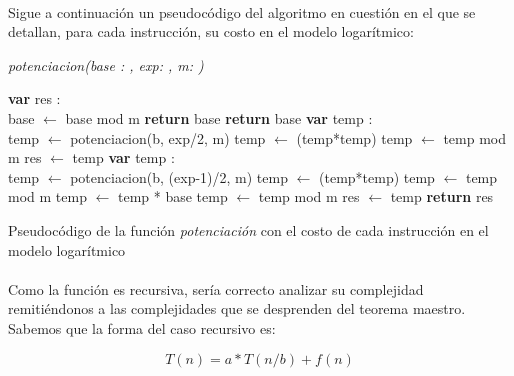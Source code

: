 {\paragraph{}
Sigue a continuación un pseudocódigo del algoritmo en cuestión en el que se detallan, para cada instrucción, su costo en el modelo logarítmico: \\

\newpage
	\incmargin{1em}
	\linesnumbered

	\textsl{potenciacion(base : \nat,  exp: \nat,  m: \nat)}\\
		\begin{algorithm}[H]
			\BlankLine
			\textbf{var} res : \entero \\
			\BlankLine
			base $\leftarrow$ base mod m 
			\BlankLine
			 	{\textbf{return} base}
			{
				{\textbf{return} base}
			{
				{\textbf{var} temp : \entero \\
				temp $\leftarrow$ potenciacion(b, exp/2, m) 
				temp $\leftarrow$ (temp*temp) 
				temp $\leftarrow$ temp mod m 
				res $\leftarrow$ temp }
				{\textbf{var} temp : \entero \\
				temp $\leftarrow$ potenciacion(b, (exp-1)/2, m) 
				temp $\leftarrow$ (temp*temp) 
				temp $\leftarrow$ temp mod m 
				temp $\leftarrow$ temp * base 
				temp $\leftarrow$ temp mod m 
				res $\leftarrow$ temp }
			}}
			\BlankLine
			\textbf{return} res
			\caption{Pseudocódigo de la función \textit{potenciación} con el costo de cada instrucción en el modelo logarítmico}
		\end{algorithm}

\paragraph{}
Como la función es recursiva, sería correcto analizar su complejidad remitiéndonos a las complejidades que se desprenden del teorema maestro. Sabemos que la forma del caso recursivo es:

\begin{equation}
	T(n) = a*T(n/b) + f(n)
\end{equation}

}
